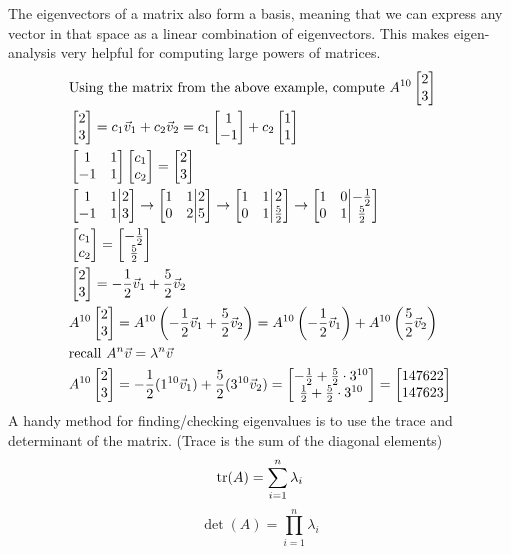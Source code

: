 \documentclass[11pt, fleqn]{article}
\begin{document}
The eigenvectors of a matrix also form a basis, meaning that we can express any vector in that space as a linear combination of eigenvectors. This makes eigen-analysis very helpful for computing large powers of matrices.
\begin{align*}
    &\text{Using the matrix from the above example, compute }A^{10}\matrixx{2\\3}\\
    &\matrixx{2\\3}=c_1\vec{v}_1+c_2\vec{v}_2=c_1\matrixx{1\\-1}+c_2\matrixx{1\\1}\\
    &\matrixx{1&1\\-1&1}\matrixx{c_1\\c_2}=\matrixx{2\\3}\\
    &\augmatrix{1&1\\-1&1}{2\\3}\to\augmatrix{1&1\\0&2}{2\\5}\to\augmatrix{1&1\\0&1}{2\\\frac{5}{2}}\to\augmatrix{1&0\\0&1}{-\frac{1}{2}\\\frac{5}{2}}\\
    &\matrixx{c_1\\c_2}=\matrixx{-\frac{1}{2}\\\frac{5}{2}}\\
    &\matrixx{2\\3}=-\frac{1}{2}\vec{v}_1+\frac{5}{2}\vec{v}_2\\
    &A^{10}\matrixx{2\\3}=A^{10}\brround{-\frac{1}{2}\vec{v}_1+\frac{5}{2}\vec{v}_2}=A^{10}\brround{-\frac{1}{2}\vec{v}_1}+A^{10}\brround{\frac{5}{2}\vec{v}_2}\\
    &\text{recall }A^n\vec{v}=\lambda^n\vec{v}\\
    &A^{10}\matrixx{2\\3}=-\frac{1}{2}(1^{10}\vec{v}_1)+\frac{5}{2}(3^{10}\vec{v}_2)=\matrixx{-\frac{1}{2}+\frac{5}{2}\cdot 3^{10}\\\frac{1}{2}+\frac{5}{2}\cdot 3^{10}}=\matrixx{147622\\147623}
\end{align*}
A handy method for finding/checking eigenvalues is to use the trace and determinant of the matrix. (Trace is the sum of the diagonal elements)
$$\operatorname{tr}(A)=\sum_{i=1}^n\lambda_i$$
$$\det(A)=\prod_{i=1}^n\lambda_i$$
\end{document}
